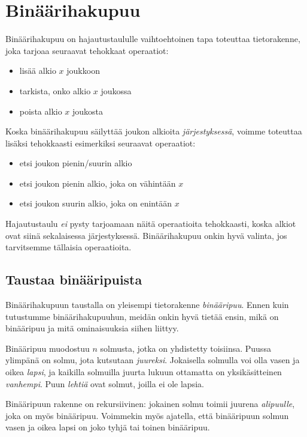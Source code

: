 \chapter{Binäärihakupuu}

Binäärihakupuu on hajautustaululle vaihtoehtoinen tapa
toteuttaa tietorakenne, joka tarjoaa seuraavat tehokkaat operaatiot:

\begin{itemize}
\item lisää alkio $x$ joukkoon
\item tarkista, onko alkio $x$ joukossa
\item poista alkio $x$ joukosta
\end{itemize}

Koska binäärihakupuu säilyttää joukon alkioita
\emph{järjestyksessä}, voimme toteuttaa lisäksi tehokkaasti
esimerkiksi seuraavat operaatiot:

\begin{itemize}
\item etsi joukon pienin/suurin alkio
\item etsi joukon pienin alkio, joka on vähintään $x$
\item etsi joukon suurin alkio, joka on enintään $x$
\end{itemize}

Hajautustaulu \emph{ei} pysty tarjoamaan näitä operaatioita tehokkaasti,
koska alkiot ovat siinä sekalaisessa järjestyksessä.
Binäärihakupuu onkin hyvä valinta, jos tarvitsemme tällaisia operaatioita.

\section{Taustaa binääripuista}

Binäärihakupuun taustalla on yleisempi tietorakenne \emph{binääripuu}.
Ennen kuin tutustumme binäärihakupuuhun,
meidän onkin hyvä tietää ensin, mikä on binääripuu ja mitä
ominaisuuksia siihen liittyy.

Binääripuu muodostuu $n$ solmusta, jotka on yhdistetty toisiinsa.
Puussa ylimpänä on solmu, jota kutsutaan \emph{juureksi}.
Jokaisella solmulla voi olla vasen ja oikea \emph{lapsi},
ja kaikilla solmuilla juurta lukuun ottamatta on yksikäsitteinen \emph{vanhempi}.
Puun \emph{lehtiä} ovat solmut, joilla ei ole lapsia.

Binääripuun rakenne on rekursiivinen:
jokainen solmu toimii juurena \emph{alipuulle},
joka on myös binääripuu.
Voimmekin myös ajatella, että binääripuun
solmun vasen ja oikea lapsi on joko tyhjä
tai toinen binääripuu.

